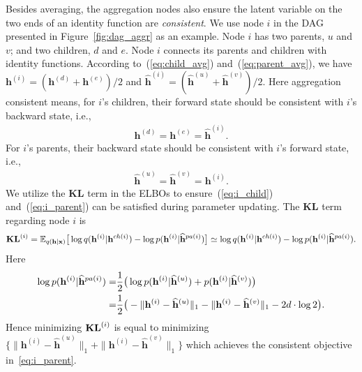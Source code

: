 \documentclass[twoside]{article}
\begin{document}
Besides averaging, the aggregation nodes also ensure the latent variable on the two ends of an identity function are \emph{consistent}. We use node $i$ in the DAG presented in Figure~\ref{fig:dag_aggr} as an example. Node $i$ has two parents, $u$ and $v$; and two children, $d$ and $e$. Node $i$  connects its parents and children with identity functions. According to~(\ref{eq:child_avg}) and~(\ref{eq:parent_avg}), we have $\mathbf{h}^{(i)} = (\mathbf{h}^{(d)}+\mathbf{h}^{(e)})/2$  and $\widehat{\mathbf{h}}^{(i)} = (\widehat{\mathbf{h}}^{(u)}+\widehat{\mathbf{h}}^{(v)})/2$.
Here aggregation consistent means, for $i$'s children, their forward state should be consistent with $i$'s backward state, i.e., 
\begin{align}\label{eq:i_child}
\mathbf{h}^{(d)} = \mathbf{h}^{(e)} = \widehat{\mathbf{h}}^{(i)} .
\end{align}%
For $i$'s parents, their backward state should be consistent with $i$'s forward state, i.e.,
\begin{align}\label{eq:i_parent}
\widehat{\mathbf{h}}^{(u)}  = \widehat{\mathbf{h}}^{(v)}  = \mathbf{h}^{(i)} .
\end{align}%
We utilize the $\mathbf{KL}$ term in the ELBOs to ensure~(\ref{eq:i_child}) and~(\ref{eq:i_parent}) can be satisfied during parameter updating. The $\mathbf{KL}$ term regarding node $i$ is
\begin{align*}%
\textbf{\text{KL}}^{(i)} = \mathbb{E}_{q(\mathbf{h}|\mathbf{x})}\big[  \log q(\mathbf{h}^{(i)}|\mathbf{h}^{ch(i)})  - \log p(\mathbf{h}^{(i)}|\widehat{\mathbf{h}}^{pa(i)}) \big]  \simeq  \log q(\mathbf{h}^{(i)}|\mathbf{h}^{ch(i)})  - \log p(\mathbf{h}^{(i)}|\widehat{\mathbf{h}}^{pa(i)}).
\end{align*} 
Here 
\begin{align} \notag
\log p(\mathbf{h}^{(i)}|\widehat{\mathbf{h}}^{pa(i)}) = &\frac{1}{2}\big(\log p(\mathbf{h}^{(i)}|\widehat{\mathbf{h}}^{(u)}) + p(\mathbf{h}^{(i)}|\widehat{\mathbf{h}}^{(v)})\big)\\ \notag
=& \frac{1}{2}\big(-\|\mathbf{h}^{(i)}- \widehat{\mathbf{h}}^{(u)}\|_1 -\|\mathbf{h}^{(i)}- \widehat{\mathbf{h}}^{(v)}\|_1-2d\cdot\log2 \big).
\end{align}
Hence minimizing $\textbf{\text{KL}}^{(i)}$ is equal to minimizing $\{\|\mathbf{h}^{(i)}- \widehat{\mathbf{h}}^{(u)}\|_1 + \|\mathbf{h}^{(i)}- \widehat{\mathbf{h}}^{(v)}\|_1 \}$ which achieves the consistent objective in~\eqref{eq:i_parent}. 
\end{document}
